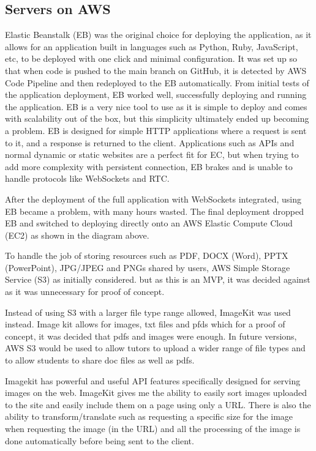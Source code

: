 \subsection{Servers on AWS}
Elastic Beanstalk (EB) was the original choice for deploying the application, as it allows for an application built in languages such as Python, Ruby, JavaScript, etc, to be deployed with one click and minimal configuration. It was set up so that when code is pushed to the main branch on GitHub, it is detected by AWS Code Pipeline and then redeployed to the EB automatically. From initial tests of the application deployment,  EB worked well, successfully deploying and running the application.  EB is a very nice tool to use as it is simple to deploy and comes with scalability out of the box, but this simplicity ultimately ended up becoming a problem. EB is designed for simple HTTP applications where a request is sent to it, and a response is returned to the client. Applications such as APIs and normal dynamic or static websites are a perfect fit for EC, but when trying to add more complexity with persistent connection, EB brakes and is unable to handle protocols like WebSockets and RTC.

After the deployment of the full application with WebSockets integrated, using EB became a problem, with many hours wasted. The final deployment dropped EB and switched to deploying directly onto an AWS Elastic Compute Cloud (EC2) as shown in the diagram above.

To handle the job of storing resources such as PDF, DOCX (Word), PPTX (PowerPoint), JPG/JPEG and PNGs shared by users, AWS Simple Storage Service (S3) as initially considered. but as this is an MVP, it was decided against as it was unnecessary for proof of concept.

Instead of using S3 with a larger file type range allowed, ImageKit was used instead. Image kit allows for images, txt files and pfds which for a proof of concept, it was decided that pdfs and images were enough. In future versions, AWS S3 would be used to allow tutors to upload a wider range of file types and to allow students to share doc files as well as pdfs.

Imagekit has powerful and useful API features specifically designed for serving images on the web. ImageKit gives me the ability to easily sort images uploaded to the site and easily include them on a page using only a URL. There is also the ability to transform/translate such as requesting a specific size for the image when requesting the image (in the URL) and all the processing of the image is done automatically before being sent to the client.

